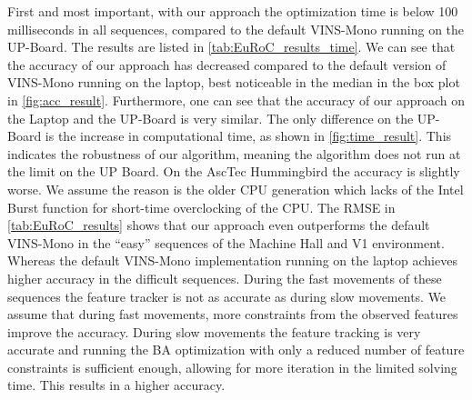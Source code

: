 First and most important, with our approach the optimization time is below 100 
milliseconds in all sequences, compared to the default VINS-Mono running on the 
UP-Board. The results are listed in \autoref{tab:EuRoC_results_time}. We can see 
that the accuracy of our approach has decreased compared to the default version 
of VINS-Mono running on the laptop, best noticeable in the median in the box 
plot in \autoref{fig:acc_result}. Furthermore, one can see that the accuracy of 
our approach on the Laptop and the UP-Board is very similar. The only difference 
on the UP-Board is the increase in computational time, as shown in 
\autoref{fig:time_result}. This indicates the robustness of our algorithm, 
meaning the algorithm does not run at the limit on the UP Board. On the AscTec 
Hummingbird the accuracy is slightly worse. We assume the reason is the older 
CPU generation which lacks of the Intel Burst function for short-time 
overclocking of the CPU. The RMSE in \autoref{tab:EuRoC_results} shows that our 
approach even outperforms the default VINS-Mono in the ``easy'' sequences of the 
Machine Hall and V1 environment. Whereas the default VINS-Mono implementation 
running on the laptop achieves higher accuracy in the difficult sequences. 
During the fast movements of these sequences the feature tracker is not as 
accurate as during slow movements. We assume that during fast movements, more 
constraints from the observed features improve the accuracy. During slow 
movements the feature tracking is very accurate and running the \ac{BA} 
optimization with only a reduced number of feature constraints is sufficient 
enough, allowing for more iteration in the limited solving time. This results in 
a higher accuracy.
